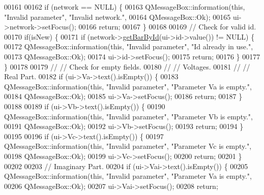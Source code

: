 \begin{DoxyCode}
00161 
00162   \textcolor{keywordflow}{if} (network == NULL) \{
00163     QMessageBox::information(\textcolor{keyword}{this}, \textcolor{stringliteral}{"Invalid parameter"}, \textcolor{stringliteral}{"Invalid network."},
00164                              QMessageBox::Ok);
00165     ui->network->setFocus();
00166     \textcolor{keywordflow}{return};
00167   \}
00168 
00169   \textcolor{comment}{// Check for valid id.}
00170   \textcolor{keywordflow}{if}(isNew) \{
00171     \textcolor{keywordflow}{if} (network->\hyperlink{group___models_ga04d524ce0fa0dd0d06deda92b1597af0}{getBarById}(ui->id->value()) != NULL) \{
00172       QMessageBox::information(\textcolor{keyword}{this}, \textcolor{stringliteral}{"Invalid parameter"}, \textcolor{stringliteral}{"Id already in use."},
00173                                QMessageBox::Ok);
00174       ui->id->setFocus();
00175       \textcolor{keywordflow}{return};
00176     \}
00177   \}
00178 
00179 \textcolor{comment}{//  // Check for empty fields.}
00180 \textcolor{comment}{//  // Voltages.}
00181 \textcolor{comment}{//  // Real Part.}
00182   \textcolor{keywordflow}{if} (ui->Va->text().isEmpty()) \{
00183     QMessageBox::information(\textcolor{keyword}{this}, \textcolor{stringliteral}{"Invalid parameter"}, \textcolor{stringliteral}{"Parameter Va is empty."},
00184                              QMessageBox::Ok);
00185     ui->Va->setFocus();
00186     \textcolor{keywordflow}{return};
00187   \}
00188 
00189   \textcolor{keywordflow}{if} (ui->Vb->text().isEmpty()) \{
00190     QMessageBox::information(\textcolor{keyword}{this}, \textcolor{stringliteral}{"Invalid parameter"}, \textcolor{stringliteral}{"Parameter Vb is empty."},
00191                              QMessageBox::Ok);
00192     ui->Vb->setFocus();
00193     \textcolor{keywordflow}{return};
00194   \}
00195 
00196   \textcolor{keywordflow}{if} (ui->Vc->text().isEmpty()) \{
00197     QMessageBox::information(\textcolor{keyword}{this}, \textcolor{stringliteral}{"Invalid parameter"}, \textcolor{stringliteral}{"Parameter Vc is empty."},
00198                              QMessageBox::Ok);
00199     ui->Vc->setFocus();
00200     \textcolor{keywordflow}{return};
00201   \}
00202 
00203   \textcolor{comment}{// Imaginary Part.}
00204   \textcolor{keywordflow}{if} (ui->Vai->text().isEmpty()) \{
00205     QMessageBox::information(\textcolor{keyword}{this}, \textcolor{stringliteral}{"Invalid parameter"}, \textcolor{stringliteral}{"Parameter Va is empty."},
00206                              QMessageBox::Ok);
00207     ui->Vai->setFocus();
00208     \textcolor{keywordflow}{return};

\end{DoxyCode}
